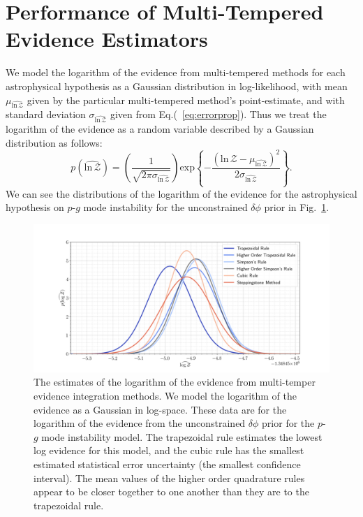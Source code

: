\section{Performance of Multi-Tempered Evidence Estimators}\label{sec:ti_ssa_performance}
We model the logarithm of the evidence from multi-tempered methods for each astrophysical hypothesis as a Gaussian distribution in log-likelihood, with mean $\mu_{\widehat{\mathrm{ln} \, \mathcal{Z}}}$ given by the particular multi-tempered method's point-estimate, and with standard deviation $\sigma_{\widehat{\mathrm{ln} \, \mathcal{Z}}}$ given from Eq.(~\ref{eq:errorprop}). Thus we treat the logarithm of the evidence as a random variable described by a Gaussian distribution as follows:
\begin{equation}\label{eqn:p_log_z}
    p(\widehat{\mathrm{ln} \, \mathcal{Z}}) = \left(\frac{1}{\sqrt{2 \pi \sigma_{\widehat{\mathrm{ln} \, \mathcal{Z}}}}} \right) \mathrm{exp} \left \{-\frac{\left(\mathrm{ln} \, \mathcal{Z} - \mu_{\widehat{\mathrm{ln} \, \mathcal{Z}}}\right)^2} {2 \sigma_{\widehat{\mathrm{ln} \, \mathcal{Z}}}}  \right\}.
\end{equation}
We can see the distributions of the logarithm of the evidence for the astrophysical hypothesis on $p$-$g$ mode instability for the unconstrained $\delta \phi$ prior in Fig.~\ref{fig:lvc_sim_log_evidence_distr}.

\begin{figure}[th]
\centering
\includegraphics[width=0.9\columnwidth]{figs/chapter6/multi_temper_log_z_lsc_sim.png}
\caption{The estimates of the logarithm of the evidence from multi-temper evidence integration methods. We model the logarithm of the evidence as a Gaussian in log-space. These data are for the logarithm of the evidence from the unconstrained $\delta \phi$ prior for the $p$-$g$ mode instability model. The trapezoidal rule estimates the lowest log evidence for this model, and the cubic rule has the smallest estimated statistical error uncertainty (the smallest confidence interval). The mean values of the higher order quadrature rules appear to be closer together to one another than they are to the trapezoidal rule.}
\label{fig:lvc_sim_log_evidence_distr}
\end{figure}

